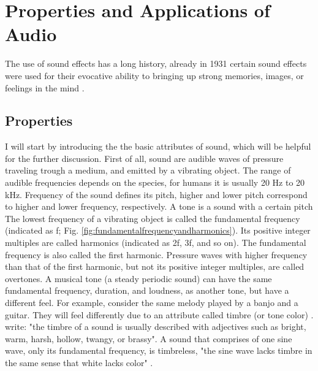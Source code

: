 \chapter{Properties and Applications of Audio}

The use of sound effects has a long history, already in 1931 certain sound effects were used for their evocative ability to bringing up strong memories, images, or feelings in the mind \parencite{bbc_yearbook_1931}.


\section{Properties} 
I will start by introducing the the basic attributes of sound, which will be helpful for the further discussion. First of all, sound are audible waves of pressure traveling trough a medium, and emitted by a vibrating object. The range of audible frequencies depends on the species, for humans it is usually 20 Hz to 20 kHz. Frequency of the sound defines its pitch, higher and lower pitch correspond to higher and lower frequency, respectively. A tone is a sound with a certain pitch The lowest frequency of a vibrating object is called the fundamental frequency (indicated as f; Fig. \ref{fig:fundamentalfrequencyandharmonics}). Its positive integer multiples are called harmonics (indicated as 2f, 3f, and so on). The fundamental frequency is also called the first harmonic. Pressure waves with higher frequency than that of the first harmonic, but not its positive integer multiples, are called overtones. A musical tone (a steady periodic sound) can have the same fundamental frequency, duration, and loudness, as another tone, but have a different feel. For example, consider the same melody played by a banjo and a guitar. They will feel differently due to an attribute called timbre (or tone color) \parencite{noauthor_fundamental_nodate}. \parencite{blattner_earcons_1989} write: "the timbre of a sound is usually described with adjectives such as bright, warm, harsh, hollow, twangy, or brassy". A sound that comprises of one sine wave, only its fundamental frequency, is timbreless, "the sine wave lacks timbre in the same sense that white lacks color" \parencite{blattner_earcons_1989}.

